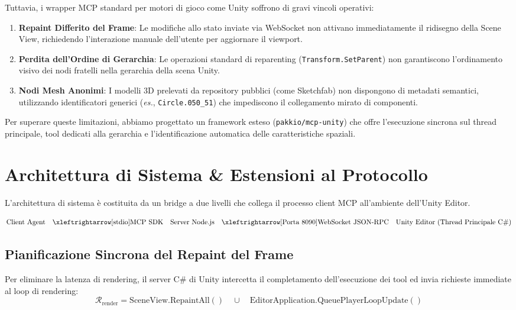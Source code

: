 \documentclass[11pt,a4paper]{article}
\begin{document}
Tuttavia, i wrapper MCP standard per motori di gioco come Unity soffrono di gravi vincoli operativi:
\begin{enumerate}
    \item \textbf{Repaint Differito del Frame}: Le modifiche allo stato inviate via WebSocket non attivano immediatamente il ridisegno della Scene View, richiedendo l'interazione manuale dell'utente per aggiornare il viewport.
    \item \textbf{Perdita dell'Ordine di Gerarchia}: Le operazioni standard di reparenting (\texttt{Transform.SetParent}) non garantiscono l'ordinamento visivo dei nodi fratelli nella gerarchia della scena Unity.
    \item \textbf{Nodi Mesh Anonimi}: I modelli 3D prelevati da repository pubblici (come Sketchfab) non dispongono di metadati semantici, utilizzando identificatori generici (\textit{es.}, \texttt{Circle.050\_51}) che impediscono il collegamento mirato di componenti.
\end{enumerate}

Per superare queste limitazioni, abbiamo progettato un framework esteso (\texttt{pakkio/mcp-unity}) che offre l'esecuzione sincrona sul thread principale, tool dedicati alla gerarchia e l'identificazione automatica delle caratteristiche spaziali.

\section{Architettura di Sistema \& Estensioni al Protocollo}

L'architettura di sistema è costituita da un bridge a due livelli che collega il processo client MCP all'ambiente dell'Unity Editor.

\begin{equation}
\text{Client Agent} \quad \xleftrightarrow[\text{stdio}]{\text{MCP SDK}} \quad \text{Server Node.js} \quad \xleftrightarrow[\text{Porta 8090}]{\text{WebSocket JSON-RPC}} \quad \text{Unity Editor (Thread Principale C\#)}
\end{equation}

\subsection{Pianificazione Sincrona del Repaint del Frame}
Per eliminare la latenza di rendering, il server C\# di Unity intercetta il completamento dell'esecuzione dei tool ed invia richieste immediate al loop di rendering:
\begin{equation}
\mathcal{R}_{\text{render}} = \text{SceneView.RepaintAll}() \quad \cup \quad \text{EditorApplication.QueuePlayerLoopUpdate}()
\end{equation}
\end{document}
